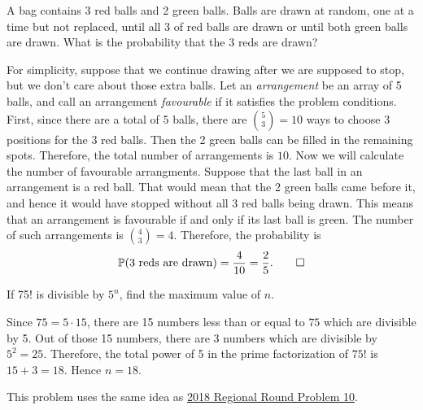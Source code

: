\begin{question}
    A bag contains 3 red balls and 2 green balls. Balls are drawn at random,
    one at a time but not replaced, until all 3 of red balls are drawn or until
    both green balls are drawn. What is the probability that the 3 reds are
    drawn? 
\end{question}
\begin{solution}
    For simplicity, suppose that we continue drawing after we are supposed to
    stop, but we don't care about those extra balls. Let an \emph{arrangement}
    be an array of 5 balls, and call an arrangement \emph{favourable} if it
    satisfies the problem conditions. First, since there are a total of 5
    balls, there are $\binom{5}{3} = 10$ ways to choose 3 positions for the 3
    red balls. Then the 2 green balls can be filled in the remaining spots.
    Therefore, the total number of arrangements is $10$. Now we will calculate
    the number of favourable arrangments. Suppose that the last ball in an
    arrangement is a red ball. That would mean that the 2 green balls came
    before it, and hence it would have stopped without all 3 red balls being
    drawn. This means that an arrangement is favourable if and only if its last
    ball is green. The number of such arrangements is $\binom{4}{3} = 4$.
    Therefore, the probability is
    \[ \mathbb{P}(\text{3 reds are drawn}) = \frac{4}{10} = \frac{2}{5}. \qedhere \]
\end{solution}

\begin{question}
    If 75! is divisible by $5^n$, find the maximum value of $n$. 
\end{question}
\begin{solution}
    Since $75 = 5 \cdot 15$, there are 15 numbers less than or equal to $75$
    which are divisible by 5. Out of those 15 numbers, there are 3 numbers
    which are divisible by $5^2 = 25$. Therefore, the total power of 5 in the
    prime factorization of $75!$ is $15 + 3 = 18$. Hence $n = 18$.
\end{solution}
\begin{remark}
    This problem uses the same idea as \hyperref[sol: 2018 Regional Round P10]{2018 Regional Round Problem 10}. 
\end{remark}

